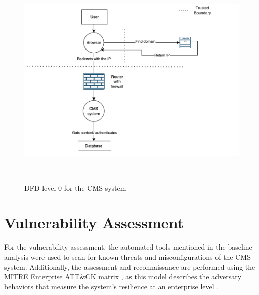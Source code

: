\begin{figure}[h!]
\centering
\includegraphics[width=\textwidth, height=400px]{pics/dfd.png}
\caption{DFD level 0 for the CMS system}\label{fig:dfd}
\end{figure}


\section{Vulnerability Assessment}
For the vulnerability assessment, the automated tools mentioned in the baseline analysis were used to scan for known threats and misconfigurations of the CMS system. Additionally, the assessment and reconnaissance are performed using the MITRE Enterprise ATT\&CK matrix \citep{mitre_url}, as this model describes the adversary behaviors that measure the system's resilience at an enterprise level \citep[p.~158]{xiong2022cyber}.


